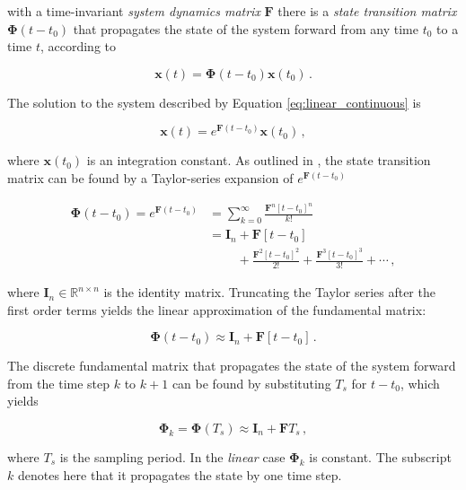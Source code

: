 \noindent
with a time-invariant \emph{system dynamics matrix} $\mathbf{F}$ there is a \emph{state transition matrix} $\bm{\Phi}(t-t_0)$ that propagates the state of the system forward from any time $t_0$ to a time $t$, according to

\begin{equation}
  \mathbf{x}(t) = \bm{\Phi}(t-t_0) \mathbf{x}(t_0)\,.
\end{equation}

\noindent
The solution to the system described by Equation \ref{eq:linear_continuous} is 

\begin{equation}
  \mathbf{x}(t) = e^{\mathbf{F}(t-t_0)} \mathbf{x}(t_0)\,,
\end{equation}

\noindent
where $\mathbf{x}(t_0)$ is an integration constant. As outlined in \cite{zarchan2009fundamentals}, the state transition matrix can be found by a Taylor-series expansion of $e^{\mathbf{F}(t-t_0)}$

\begin{equation}
\begin{split}
  \bm{\Phi}(t-t_0) = e^{\mathbf{F}(t-t_0)} &= \sum_{k=0} ^ {\infty} \frac {\mathbf{F}^{n} [t-t_0]^n}{k!} \\
  &= \mathbf{I}_n + \mathbf{F}[t-t_0] \\ 
  & \mathrel{\phantom{= \mathbf{I}_n}} + \frac{\mathbf{F}^2 [t-t_0]^2}{2!} +\frac{\mathbf{F}^{3} [t-t_0]^3}{3!} + \cdots\,,
\end{split}
\end{equation}
 
\noindent
where $\mathbf{I}_n \in \mathbb{R}^{n \times n}$ is the identity matrix. Truncating the Taylor series after the first order terms yields the linear approximation of the fundamental matrix:

\begin{equation}
  \bm{\Phi}(t-t_0) \approx \mathbf{I}_n + \mathbf{F}[t-t_0]\,.
\end{equation}

\noindent
The discrete fundamental matrix that propagates the state of the system forward from the time step $k$ to $k+1$ can be found by substituting $T_s$ for $t-t_0$, which yields

\begin{equation}
  \bm{\Phi}_{k} = \bm{\Phi}(T_s) \approx \mathbf{I}_{n} + \mathbf{F} T_s\,,
\end{equation}

\noindent
where $T_s$ is the sampling period. In the \emph{linear} case $\bm{\Phi}_{k}$ is constant. The subscript $k$ denotes here that it propagates the state by one time step.

